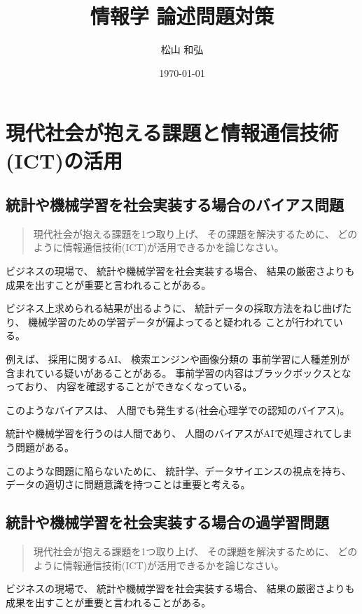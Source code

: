 \documentclass[12pt]{jsarticle}
\title{
情報学
論述問題対策
}
\author{松山 和弘}
\date{\today}
\begin{document}
\maketitle

\section{現代社会が抱える課題と情報通信技術(ICT)の活用}

\subsection{
統計や機械学習を社会実装する場合のバイアス問題
}

\begin{quotation}
現代社会が抱える課題を1つ取り上げ、
その課題を解決するために、
どのように情報通信技術(ICT)が活用できるかを論じなさい。
\end{quotation}

ビジネスの現場で、
統計や機械学習を社会実装する場合、
結果の厳密さよりも
成果を出すことが重要と言われることがある。

ビジネス上求められる結果が出るように、
統計データの採取方法をねじ曲げたり、
機械学習のための学習データが偏よってると疑われる
ことが行われている。

例えば、
採用に関するAI、
検索エンジンや画像分類の
事前学習に人種差別が含まれている疑いがあることがある。
事前学習の内容はブラックボックスとなっており、
内容を確認することができなくなっている。

このようなバイアスは、
人間でも発生する(社会心理学での認知のバイアス)。

統計や機械学習を行うのは人間であり、
人間のバイアスがAIで処理されてしまう問題がある。

このような問題に陥らないために、
統計学、データサイエンスの視点を持ち、
データの適切さに問題意識を持つことは重要と考える。

\subsection{
統計や機械学習を社会実装する場合の過学習問題
}

\begin{quotation}
現代社会が抱える課題を1つ取り上げ、
その課題を解決するために、
どのように情報通信技術(ICT)が活用できるかを論じなさい。
\end{quotation}

ビジネスの現場で、
統計や機械学習を社会実装する場合、
結果の厳密さよりも
成果を出すことが重要と言われることがある。
\end{document}
